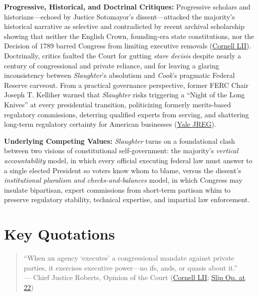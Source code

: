 \documentclass[12pt]{article}
\begin{document}
\textbf{Progressive, Historical, and Doctrinal Critiques:} Progressive scholars and historians---echoed by Justice Sotomayor's dissent---attacked the majority's historical narrative as selective and contradicted by recent archival scholarship showing that neither the English Crown, founding-era state constitutions, nor the Decision of 1789 barred Congress from limiting executive removals (\href{https://www.law.cornell.edu/supremecourt/text/25-332}{Cornell LII}). Doctrinally, critics faulted the Court for gutting \textit{stare decisis} despite nearly a century of congressional and private reliance, and for leaving a glaring inconsistency between \textit{Slaughter}'s absolutism and \textit{Cook}'s pragmatic Federal Reserve carveout. From a practical governance perspective, former FERC Chair Joseph T. Kelliher warned that \textit{Slaughter} risks triggering a ``Night of the Long Knives'' at every presidential transition, politicizing formerly merits-based regulatory commissions, deterring qualified experts from serving, and shattering long-term regulatory certainty for American businesses (\href{https://www.yalejreg.com/nc/implications-of-trump-v-slaughter-for-the-integrity-of-future-federal-commission-decisionmaking/}{Yale JREG}).

\textbf{Underlying Competing Values:} \textit{Slaughter} turns on a foundational clash between two visions of constitutional self-government: the majority's \emph{vertical accountability} model, in which every official executing federal law must answer to a single elected President so voters know whom to blame, versus the dissent's \emph{institutional pluralism and checks-and-balances} model, in which Congress may insulate bipartisan, expert commissions from short-term partisan whim to preserve regulatory stability, technical expertise, and impartial law enforcement.

\section{Key Quotations}

\begin{quote}
``When an agency `executes' a congressional mandate against private parties, it exercises executive power---no ifs, ands, or quasis about it.'' \\
--- Chief Justice Roberts, Opinion of the Court (\href{https://www.law.cornell.edu/supremecourt/text/25-332}{Cornell LII}; \href{https://www.supremecourt.gov/opinions/25pdf/25-322_new_4gcj.pdf}{Slip Op. at 22})
\end{quote}
\end{document}
